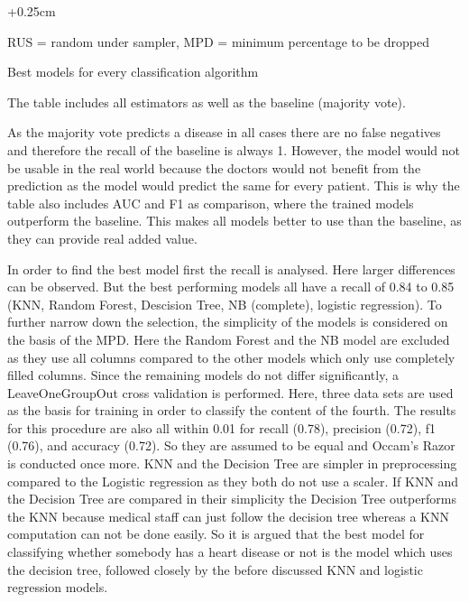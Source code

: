 \begin{table}[h]
\begin{adjustwidth}{-0.25cm}{}
\begin{footnotesize}
		 \begin{adjustwidth}{+0.25cm}{}
		\begin{center}
			\centering
			RUS = random under sampler, MPD = minimum percentage to be dropped
		\end{center}
		\end{adjustwidth}
	\end{footnotesize}
	\caption{Best models for every classification algorithm}
	\label{table:modelresults}

	 \end{adjustwidth}
\end{table}

The table includes all estimators as well as the baseline (majority vote). 

As the majority vote predicts a disease in all cases there are no false negatives and therefore the recall of the baseline is always 1. However, the model would not be usable in the real world because the doctors would not benefit from the prediction as the model would predict the same for every patient. This is why the table also includes AUC and F1 as comparison, where the trained models outperform the baseline. This makes all models better to use than the baseline, as they can provide real added value. 

In order to find the best model first the recall is analysed. Here larger differences can be observed. But the best performing models all have a recall of 0.84 to 0.85 (KNN, Random Forest, Descision Tree, NB (complete), logistic regression).  To further narrow down the selection, the simplicity of the models is considered on the basis of the MPD. Here the Random Forest and the NB model are excluded as they use all columns compared to the other models which only use completely filled columns. Since the remaining models do not differ significantly, a LeaveOneGroupOut cross validation is performed. Here, three data sets are used as the basis for training in order to classify the content of the fourth. The results for this procedure are also all within 0.01 for recall (0.78), precision (0.72), f1 (0.76), and accuracy (0.72). So they are assumed to be equal and Occam's Razor is conducted once more. KNN and the Decision Tree are simpler in preprocessing compared to the Logistic regression as they both do not use a scaler. If KNN and the Decision Tree are compared in their simplicity the Decision Tree outperforms the KNN because medical staff can just follow the decision tree whereas a KNN computation can not be done easily. 
So it is argued that the best model for classifying whether somebody has a heart disease or not is the model which uses the decision tree, followed closely by the before discussed KNN and logistic regression models.


